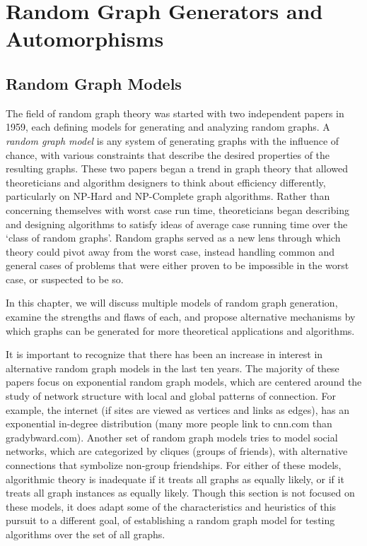 \chapter{Random Graph Generators and Automorphisms}

\section{Random Graph Models}

The field of random graph theory was started with two independent papers in 1959, each defining models for generating and analyzing random graphs.
A \emph{random graph model} is any system of generating graphs with the influence of chance, with various constraints that describe the desired properties of the resulting graphs.
These two papers began a trend in graph theory that allowed theoreticians and algorithm designers to think about efficiency differently, particularly on NP-Hard and NP-Complete graph algorithms.
Rather than concerning themselves with worst case run time, theoreticians began describing and designing algorithms to satisfy ideas of average case running time over the `class of random graphs'.
Random graphs served as a new lens through which theory could pivot away from the worst case, instead handling common and general cases of problems that were either proven to be impossible in the worst case, or suspected to be so. 

In this chapter, we will discuss multiple models of random graph generation, examine the strengths and flaws of each, and propose alternative mechanisms by which graphs can be generated for more theoretical applications and algorithms.

It is important to recognize that there has been an increase in interest in alternative random graph models in the last ten years.
The majority of these papers focus on exponential random graph models, which are centered around the study of network structure with local and global patterns of connection.
For example, the internet (if sites are viewed as vertices and links as edges), has an exponential in-degree distribution (many more people link to cnn.com than gradybward.com).
Another set of random graph models tries to model social networks, which are categorized by cliques (groups of friends), with alternative connections that symbolize non-group friendships.
For either of these models, algorithmic theory is inadequate if it treats all graphs as equally likely, or if it treats all graph instances as equally likely.
Though this section is not focused on these models, it does adapt some of the characteristics and heuristics of this pursuit to a different goal, of establishing a random graph model for testing algorithms over the set of all graphs.

